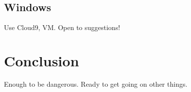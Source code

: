 
\subsection{Windows} %
\label{sec:windows}

Use Cloud9, VM. Open to suggestions!



\section{Conclusion} %
\label{sec:conclusion}

Enough to be dangerous. Ready to get going on other things.

